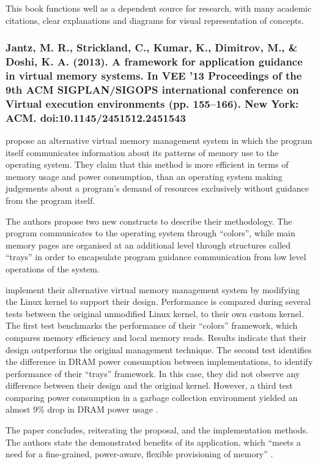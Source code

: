 This book functions well as a dependent source for research, with many academic citations, clear explanations and diagrams for visual representation of concepts.

\subsubsection*{Jantz, M. R., Strickland, C., Kumar, K., Dimitrov, M., \& Doshi, K. A. (2013). A framework for application guidance in virtual memory systems. In VEE ’13 Proceedings of the 9th ACM SIGPLAN/SIGOPS international conference on Virtual execution environments (pp. 155–166). New York: ACM. doi:10.1145/2451512.2451543}

\citet{Jantz2013} propose an alternative virtual memory management system in which the program itself communicates information about its patterns of memory use to the operating system. They claim that this method is more efficient in terms of memory usage and power consumption, than an operating system making judgements about a program's demand of resources exclusively without guidance from the program itself.

The authors propose two new constructs to describe their methodology. The program communicates to the operating system through ``colors'', while main memory pages are organised at an additional level through structures called ``trays'' in order to encapsulate program guidance communication from low level operations of the system.

\citet{Jantz2013} implement their alternative virtual memory management system by modifying the Linux kernel to support their design. Performance is compared during several tests between the original unmodified Linux kernel, to their own custom kernel. The first test benchmarks the performance of their ``colors'' framework, which compares memory efficiency and local memory reads. Results indicate that their design outperforms the original management technique. The second test identifies the difference in DRAM power consumption between implementations, to identify performance of their ``trays'' framework. In this case, they did not observe any difference between their design and the original kernel. However, a third test comparing power consumption in a garbage collection environment yielded an almost 9\% drop in DRAM power usage \citep[p. 164]{Jantz2013}.

The paper concludes, reiterating the proposal, and the implementation methods. The authors state the demonstrated benefits of its application, which ``meets a need for a fine-grained, power-aware, flexible provisioning of memory'' \citep[p. 164]{Jantz2013}.